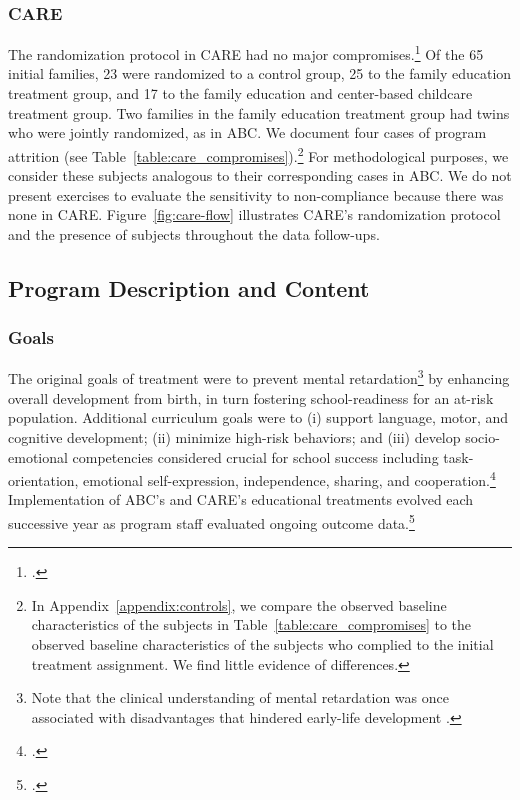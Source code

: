 \begin{appendices}
\subsubsection{CARE}

\noindent The randomization protocol in CARE had no major compromises.\footnote{\citet{Wasik_Ramey_etal_1990_CD,Burchinal_Campbell_etal_1997_CD}.} Of the 65 initial families, 23 were randomized to a control group, 25 to the family education treatment group, and 17 to the family education and center-based childcare treatment group. Two families in the family education treatment group had twins who were jointly randomized, as in ABC. We document four cases of program attrition (see Table~\ref{table:care_compromises}).\footnote{In Appendix~\ref{appendix:controls}, we compare the observed baseline characteristics of the subjects in Table~\ref{table:care_compromises} to the observed baseline characteristics of the subjects who complied to the initial treatment assignment. We find little evidence of differences.} For methodological purposes, we consider these subjects analogous to their corresponding cases in ABC. We do not present exercises to evaluate the sensitivity to non-compliance because there was none in CARE. Figure~\ref{fig:care-flow} illustrates CARE's randomization protocol and the presence of subjects throughout the data follow-ups.\\




\subsection{Program Description and Content}

\subsubsection{Goals}
\noindent The original goals of treatment were to prevent mental retardation\footnote{Note that the clinical understanding of mental retardation was once associated with disadvantages that hindered early-life development \citep{Mental-Retardation_America_2004_BOOK_NYU}.} by enhancing overall development from birth, in turn fostering school-readiness for an at-risk population. Additional curriculum goals were to (i) support language, motor, and cognitive development; (ii) minimize high-risk behaviors; and (iii) develop socio-emotional competencies considered crucial for school success including task-orientation, emotional self-expression, independence, sharing, and cooperation.\footnote{\citet{Ramey_Collier_etal_1976_CarolinaAbecedarianProject, Ramey_etal_1985_Project-CARE_TiECSE, Sparling_1974_Synth_Edu_Infant_SPEECH, Wasik_Ramey_etal_1990_CD, Ramey-etal_2012-ABC}.} Implementation of ABC's and CARE's educational treatments evolved each successive year as program staff evaluated ongoing outcome data.\footnote{ \citet{Ramey-etal_1975_AJoMD, Finkelstein_1982_Day_Care_YC, McGinness_1982_Language-Poverty-Child,Haskins_1985_CD}.}\\



\end{appendices}
